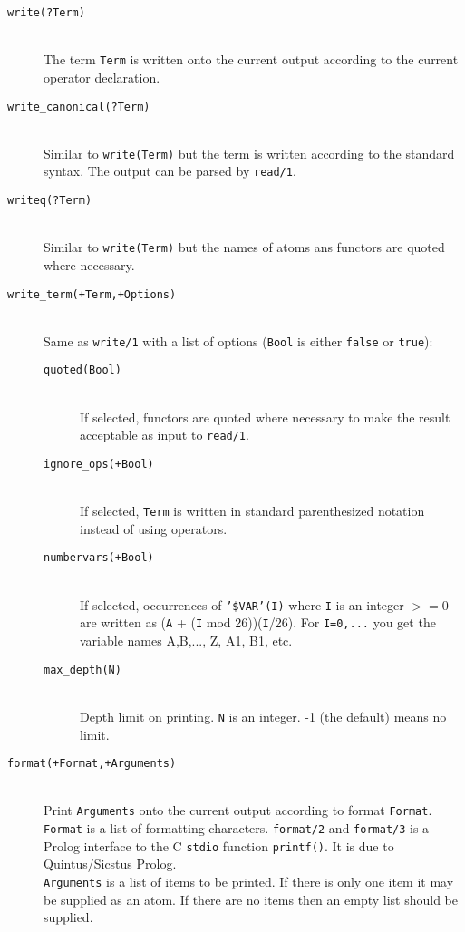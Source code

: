 \begin{description}
\begin{description}
	\end{description}

\item [{\tt write(?Term)}]~\\ 
	The term {\tt Term} is written onto the current output
	according to the current operator declaration.

\item [{\tt write\_canonical(?Term)}]~\\ 
	Similar to {\tt write(Term)} but the term is written according
	to the standard syntax. The output can be parsed by {\tt read/1}.

\item [{\tt writeq(?Term)}]~\\ 
	Similar to {\tt write(Term)} but the names of atoms ans
	functors are quoted where necessary.

\item[{\tt write\_term(+Term,+Options)}]~\\
	Same as {\tt write/1} with a list of options ({\tt Bool} is
	either {\tt false} or {\tt true}): 

	\begin{description}

	\item[{\tt quoted(Bool)}]~\\
	If selected, functors are quoted where necessary to make the result
	acceptable as input to {\tt read/1}. 

	\item[{\tt ignore\_ops(+Bool)}]~\\
	If selected, {\tt Term} is written in standard parenthesized notation
	instead of using operators.

	\item[{\tt numbervars(+Bool)}]~\\
	If selected, occurrences of {\tt '\$VAR'(I)} where {\tt I} is an
	integer $>= 0$ are written as 
	({\tt A} + ({\tt I} mod 26))({\tt I}/26). For {\tt I=0,...} you
	get the variable names A,B,..., Z, A1, B1, etc. 	

	\item[{\tt max\_depth(N)}]~\\
	Depth limit on printing.  {\tt N} is an integer.  -1 (the
	default) means 	no limit.

	\end{description}


\item [{\tt format(+Format,+Arguments)}]~\\ 
	Print {\tt Arguments} onto the current output according to format
	{\tt Format}.  {\tt Format} is a list of formatting characters. 
	{\tt format/2} and {\tt format/3} is a Prolog interface to the
	C {\tt stdio} function {\tt printf()}.  It is due to Quintus/Sicstus
	Prolog. \\
	{\tt Arguments} is a list of items to be printed.  If there is
	only one item it may be supplied as an atom.  If there are no
	items then an empty list should be supplied.
	

\end{description}
